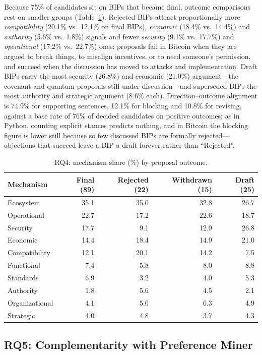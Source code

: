 \documentclass[sigconf,screen]{acmart}
\begin{document}
Because 75\% of candidates sit on BIPs that became final, outcome comparisons rest on smaller groups (Table~\ref{tab:outcomes}). Rejected BIPs attract proportionally more \emph{compatibility} (20.1\% vs.\ 12.1\% on final BIPs), \emph{economic} (18.4\% vs.\ 14.4\%) and \emph{authority} (5.6\% vs.\ 1.8\%) signals and fewer \emph{security} (9.1\% vs.\ 17.7\%) and \emph{operational} (17.2\% vs.\ 22.7\%) ones: proposals fail in Bitcoin when they are argued to break things, to misalign incentives, or to need someone's permission, and succeed when the discussion has moved to attacks and implementation. Draft BIPs carry the most security (26.8\%) and economic (21.0\%) argument---the covenant and quantum proposals still under discussion---and superseded BIPs the most authority and strategic argument (8.6\% each). Direction--outcome alignment is 74.9\% for supporting sentences, 12.1\% for blocking and 10.8\% for revising, against a base rate of 76\% of decided candidates on positive outcomes; as in Python, counting explicit stances predicts nothing, and in Bitcoin the blocking figure is lower still because so few discussed BIPs are formally rejected---objections that succeed leave a BIP a draft forever rather than ``Rejected''.

\begin{table}[t]
\caption{RQ4: mechanism share (\%) by proposal outcome.}
\label{tab:outcomes}
\small
\setlength{\tabcolsep}{4pt}
\begin{tabular}{lrrrr}
\toprule
Mechanism & Final (89) & Rejected (22) & Withdrawn (15) & Draft (25) \\
\midrule
Ecosystem & 35.1 & 35.0 & 32.8 & 26.7 \\
Operational & 22.7 & 17.2 & 22.6 & 18.7 \\
Security & 17.7 & 9.1 & 12.9 & 26.8 \\
Economic & 14.4 & 18.4 & 14.9 & 21.0 \\
Compatibility & 12.1 & 20.1 & 14.2 & 7.5 \\
Functional & 7.4 & 5.8 & 8.0 & 8.8 \\
Standards & 6.9 & 3.2 & 4.0 & 5.3 \\
Authority & 1.8 & 5.6 & 4.5 & 2.1 \\
Organizational & 4.1 & 5.0 & 6.3 & 4.9 \\
Strategic & 4.0 & 4.8 & 3.7 & 4.3 \\
\bottomrule
\end{tabular}
\end{table}

\subsection{RQ5: Complementarity with Preference Miner}
\end{document}
